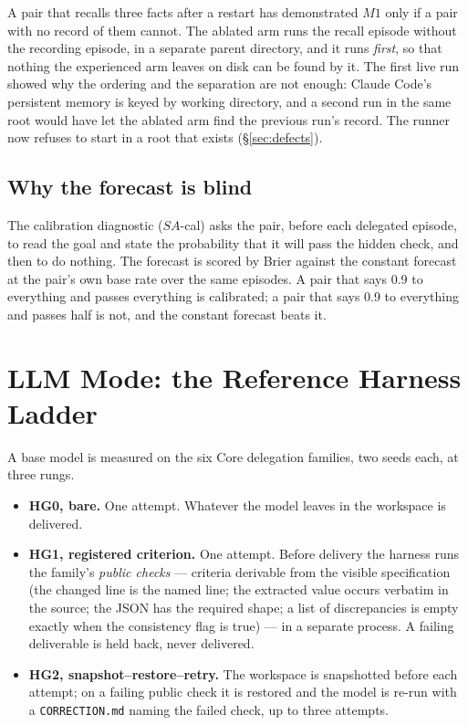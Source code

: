 \documentclass[11pt]{article}
\theoremstyle{definition}
\begin{document}
A pair that recalls three facts after a restart has demonstrated $M1$ only if a pair with no record of them cannot. The ablated arm runs the recall episode without the recording episode, in a separate parent directory, and it runs \emph{first}, so that nothing the experienced arm leaves on disk can be found by it. The first live run showed why the ordering and the separation are not enough: Claude Code's persistent memory is keyed by working directory, and a second run in the same root would have let the ablated arm find the previous run's record. The runner now refuses to start in a root that exists (\S\ref{sec:defects}).

\subsection{Why the forecast is blind}

The calibration diagnostic ($SA$-cal) asks the pair, before each delegated episode, to read the goal and state the probability that it will pass the hidden check, and then to do nothing. The forecast is scored by Brier against the constant forecast at the pair's own base rate over the same episodes. A pair that says 0.9 to everything and passes everything is calibrated; a pair that says 0.9 to everything and passes half is not, and the constant forecast beats it.

\section{LLM Mode: the Reference Harness Ladder}\label{sec:llm}

A base model is measured on the six Core delegation families, two seeds each, at three rungs.

\begin{itemize}[leftmargin=*,itemsep=2pt]
\item \textbf{HG0, bare.} One attempt. Whatever the model leaves in the workspace is delivered.
\item \textbf{HG1, registered criterion.} One attempt. Before delivery the harness runs the family's \emph{public checks} --- criteria derivable from the visible specification (the changed line is the named line; the extracted value occurs verbatim in the source; the JSON has the required shape; a list of discrepancies is empty exactly when the consistency flag is true) --- in a separate process. A failing deliverable is held back, never delivered.
\item \textbf{HG2, snapshot--restore--retry.} The workspace is snapshotted before each attempt; on a failing public check it is restored and the model is re-run with a \texttt{CORRECTION.md} naming the failed check, up to three attempts.
\end{itemize}
\end{document}
